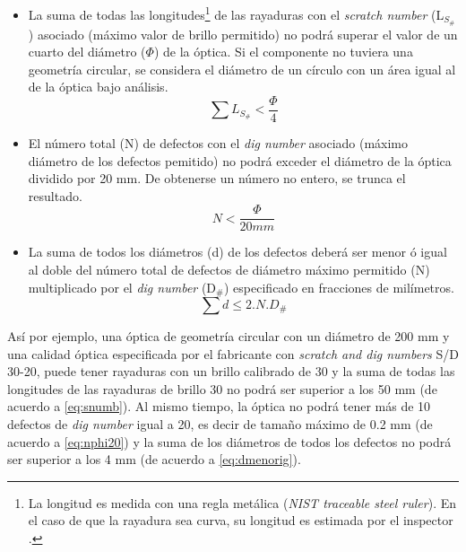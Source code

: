 \begin{itemize}
\item La suma de todas las longitudes\footnote{La longitud es medida con una regla metálica (\textit{NIST traceable steel ruler}). En el caso de que la rayadura sea curva, su longitud es estimada por el inspector \cite{Aikens}.} de las rayaduras con el \textit{scratch number} (L$_{S_{\#}}$) asociado (máximo valor de brillo permitido) no podrá superar el valor de un cuarto del diámetro ($\Phi$) de la óptica. Si el componente no tuviera una geometría circular, se considera el diámetro de un círculo con un área igual al de la óptica bajo análisis.
\begin{equation}
\sum L_{S_{\#}} < \frac{\Phi}{4}
\label{eq:snumb}
\end{equation}
\item El número total (N) de defectos con el \textit{dig number} asociado (máximo diámetro de los defectos pemitido) no podrá exceder el diámetro de la óptica dividido por 20 mm. De obtenerse un número no entero, se trunca el resultado.
\begin{equation}
N  <  \frac{\Phi}{20 mm}
\label{eq:nphi20}
\end{equation}
\item La suma de todos los diámetros (d) de los defectos deberá ser menor ó igual al doble del número total de defectos de diámetro máximo permitido (N) multiplicado por el \textit{dig number} (D$_{\#}$) especificado en fracciones de milímetros.
\begin{equation}
\sum d 	\leq 2 . N . D_{\#}
\label{eq:dmenorig}
\end{equation}
\end{itemize}
\hspace{0.5cm}Así por ejemplo, una óptica de geometría circular con un diámetro de 200 mm y una calidad óptica especificada por el fabricante con \textit{scratch and dig numbers} S/D 30-20, puede tener rayaduras con un brillo calibrado de 30 y la suma de todas las longitudes de las rayaduras de brillo 30 no podrá ser superior a los 50 mm (de acuerdo a \eqref{eq:snumb}). Al mismo tiempo, la óptica no podrá tener más de 10 defectos de \textit{dig number} igual a 20, es decir de tamaño máximo de 0.2 mm (de acuerdo a  \eqref{eq:nphi20}) y la suma de los diámetros de todos los defectos no podrá ser superior a los 4 mm (de acuerdo a \eqref{eq:dmenorig}).

